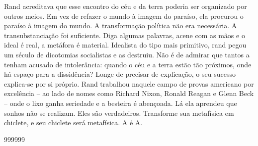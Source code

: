 \par
 
Rand acreditava que esse encontro do céu e da terra poderia ser organizado por outros meios. Em vez de refazer o mundo à imagem do paraíso, ela procurou o paraíso à imagem do mundo. A transformação política não era necessária. A transubstanciação foi suficiente. Diga algumas palavras, acene com as mãos e o ideal é real, a metáfora é material. Idealista do tipo mais primitivo, rand pegou um século de dicotomias socialistas e as destruiu. Não é de admirar que tantos a tenham acusado de intolerância: quando o céu e a terra estão tão próximos, onde há espaço para a dissidência? Longe de precisar de explicação, o seu sucesso explica-se por si próprio. Rand trabalhou naquele campo de provas americano por excelência – ao lado de nomes como Richard Nixon, Ronald Reagan e Glenn Beck – onde o lixo ganha seriedade e a besteira é abençoada. Lá ela aprendeu que sonhos não se realizam. Eles são verdadeiros. Transforme sua metafísica em chiclete, e seu chiclete será metafísica. A é A.
 
\par
  
 
999999
